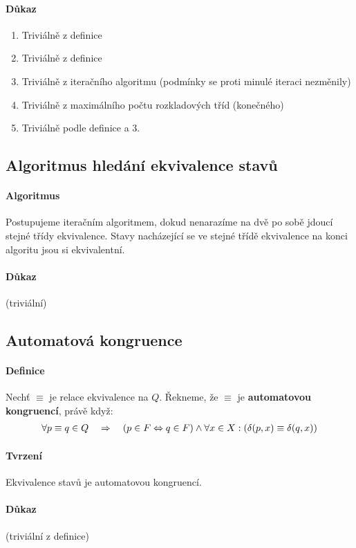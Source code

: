 \documentclass[a4paper,12pt,titlepage]{article}
\begin{document}
\paragraph{Důkaz}
\begin{enumerate}
	\item Triviálně z definice
	\item Triviálně z definice
	\item Triviálně z iteračního algoritmu (podmínky se proti minulé iteraci
	nezměnily)
	\item Triviálně z maximálního počtu rozkladových tříd (konečného)
	\item Triviálně podle definice a 3.
\end{enumerate}
\subsection{Algoritmus hledání ekvivalence stavů}
\setcounter{equation}{0}
\paragraph{Algoritmus}
Postupujeme iteračním algoritmem, dokud nenarazíme na dvě po sobě jdoucí stejné
třídy ekvivalence. Stavy nacházející se ve stejné třídě ekvivalence na konci
algoritu jsou si ekvivalentní.
\paragraph{Důkaz} (triviální)
\subsection{Automatová kongruence}
\setcounter{equation}{0}
\paragraph{Definice}
Nechť $\equiv$ je relace ekvivalence na $Q$. Řekneme, že $\equiv$ je
\textbf{automatovou kongruencí}, právě když:
\begin{align*}
	\forall p \equiv q \in Q \quad \Rightarrow \quad (p \in F \Leftrightarrow q \in F) \land \forall x
	\in X: (\delta(p, x) \equiv \delta(q, x))
\end{align*}
\paragraph{Tvrzení}
Ekvivalence stavů je automatovou kongruencí.
\paragraph{Důkaz}
(triviální z definice)
\end{document}
